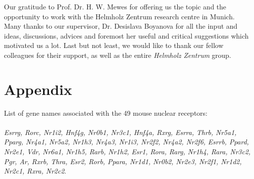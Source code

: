 \documentclass[fleqn,11pt]{SelfArx}
\begin{document}
Our gratitude to Prof. Dr. H. W. Mewes for offering us the topic and the opportunity to work with the Helmholz Zentrum research centre in Munich. Many thanks to our supervisor, Dr. Desislava Boyanova for all the input and ideas, discussions, advices and foremost her useful and critical suggestions which motivated us a lot. Last but not least, we would like to thank our fellow colleagues for their support, as well as the entire \emph{Helmholz Zentrum} group. 
\section{Appendix}
\label{an:appendix}
List of gene names associated with the 49 mouse nuclear receptors:
~~~~~~~\\
~~~~~~~\\
\textit{Esrrg, Rorc, Nr1i2, Hnf4g, Nr0b1, Nr3c1, Hnf4a, Rxrg, Esrra, Thrb, Nr5a1, Pparg, Nr4a1, Nr5a2, Nr1h3, Nr4a3, Nr1i3, Nr2f2, Nr4a2, Nr2f6, Esrrb, Ppard, Nr2e1, Vdr, Nr6a1, Nr1h5, Rarb, Nr1h2, Esr1, Rora, Rarg, Nr1h4, Rara, Nr3c2, Pgr, Ar, Rxrb, Thra, Esr2, Rorb, Ppara, Nr1d1, Nr0b2, Nr2e3, Nr2f1, Nr1d2, Nr2c1, Rxra, Nr2c2}.




\end{document}
